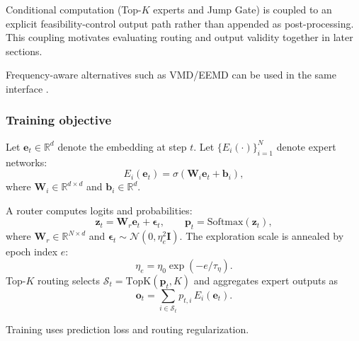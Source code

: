 \documentclass[review,1p,times]{elsarticle}
\begin{document}
Conditional computation (Top-$K$ experts and Jump Gate) is coupled to an explicit feasibility-control output path rather than appended as post-processing. This coupling motivates evaluating routing and output validity together in later sections.

Frequency-aware alternatives such as VMD/EEMD can be used in the same interface \cite{dragomiretskiy2014vmd,wu2009eemd}.

\subsubsection{Training objective}
Let $\mathbf{e}_t \in \mathbb{R}^{d}$ denote the embedding at step $t$. Let $\{E_i(\cdot)\}_{i=1}^{N}$ denote expert networks:
\begin{equation}
E_i(\mathbf{e}_t)=\sigma(\mathbf{W}_i\mathbf{e}_t+\mathbf{b}_i),
\end{equation}
where $\mathbf{W}_i \in \mathbb{R}^{d\times d}$ and $\mathbf{b}_i \in \mathbb{R}^{d}$.

A router computes logits and probabilities:
\begin{equation}
\mathbf{z}_t = \mathbf{W}_r\mathbf{e}_t + \boldsymbol{\epsilon}_t,\qquad
\mathbf{p}_t = \mathrm{Softmax}(\mathbf{z}_t),
\label{eq:router_softmax}
\end{equation}
where $\mathbf{W}_r\in\mathbb{R}^{N\times d}$ and $\boldsymbol{\epsilon}_t\sim\mathcal{N}(0,\eta_e^2\mathbf{I})$. The exploration scale is annealed by epoch index $e$:
\begin{equation}
\eta_e=\eta_0\exp(-e/\tau_{\eta}).
\label{eq:router_anneal}
\end{equation}
Top-$K$ routing selects $\mathcal{S}_t=\mathrm{TopK}(\mathbf{p}_t,K)$ and aggregates expert outputs as
\begin{equation}
\mathbf{o}_t = \sum_{i\in\mathcal{S}_t} p_{t,i}\,E_i(\mathbf{e}_t).
\label{eq:moe_topk}
\end{equation}


\label{subsec:method_edge_train}
Training uses prediction loss and routing regularization.
\end{document}

